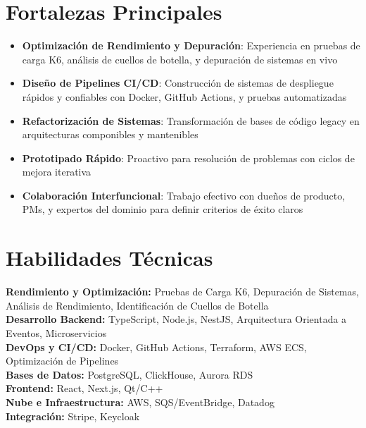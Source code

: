 \documentclass[11pt,a4paper]{article}
\begin{document}
\section{Fortalezas Principales}

\begin{itemize}
  \item \textbf{Optimización de Rendimiento y Depuración}: Experiencia en pruebas de carga K6, análisis de cuellos de botella, y depuración de sistemas en vivo
  \item \textbf{Diseño de Pipelines CI/CD}: Construcción de sistemas de despliegue rápidos y confiables con Docker, GitHub Actions, y pruebas automatizadas
  \item \textbf{Refactorización de Sistemas}: Transformación de bases de código legacy en arquitecturas componibles y mantenibles
  \item \textbf{Prototipado Rápido}: Proactivo para resolución de problemas con ciclos de mejora iterativa
  \item \textbf{Colaboración Interfuncional}: Trabajo efectivo con dueños de producto, PMs, y expertos del dominio para definir criterios de éxito claros
\end{itemize}

\section{Habilidades Técnicas}

\textbf{Rendimiento y Optimización:} Pruebas de Carga K6, Depuración de Sistemas, Análisis de Rendimiento, Identificación de Cuellos de Botella\\[0.4em]
\textbf{Desarrollo Backend:} TypeScript, Node.js, NestJS, Arquitectura Orientada a Eventos, Microservicios\\[0.4em]
\textbf{DevOps y CI/CD:} Docker, GitHub Actions, Terraform, AWS ECS, Optimización de Pipelines\\[0.4em]
\textbf{Bases de Datos:} PostgreSQL, ClickHouse, Aurora RDS\\[0.4em]
\textbf{Frontend:} React, Next.js, Qt/C++\\[0.4em]
\textbf{Nube e Infraestructura:} AWS, SQS/EventBridge, Datadog\\[0.4em]
\textbf{Integración:} Stripe, Keycloak
\end{document}
